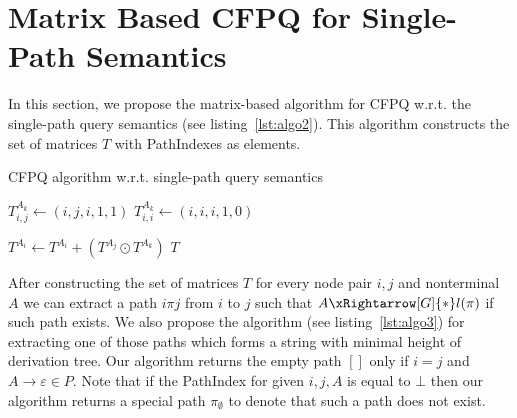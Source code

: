 \section{Matrix Based CFPQ for Single-Path Semantics}
In this section, we propose the matrix-based algorithm for CFPQ w.r.t. the single-path query semantics (see listing~\ref{lst:algo2}). This algorithm constructs the set of matrices $T$ with PathIndexes as elements.
{\small
	\begin{algorithm}
		\begin{algorithmic}[1]
			\caption{CFPQ algorithm w.r.t. single-path query semantics}
			\label{lst:algo2}
			{$T^{A_k}_{i,j} \gets (i,j,i,1,1)$}
			\EndFor
			{$T^{A_k}_{i,i} \gets (i,i,i,1,0)$}
			\EndFor
			
			{ $T^{A_i} \gets T^{A_i} + (T^{A_j} \odot T^{A_k})$ } 
			\EndFor
			\EndWhile
			\State \Return $T$
			\EndFunction
		\end{algorithmic}
	\end{algorithm}
}

After constructing the set of matrices $T$ for every node pair $i, j$ and nonterminal $A$ we can extract a path $i \pi j$ from $i$ to $j$ such that $A \xRightarrow[G]{*} l(\pi)$ if such path exists. We also propose the algorithm (see listing~\ref{lst:algo3}) for extracting one of those paths which forms a string with minimal height of derivation tree. Our algorithm returns the empty path $[]$ only if $i = j$ and $A \to \varepsilon \in P$. Note that if the PathIndex for given $i,j,A$ is equal to $\bot$ then our algorithm returns a special path $\pi_{\emptyset}$ to denote that such a path does not exist.

